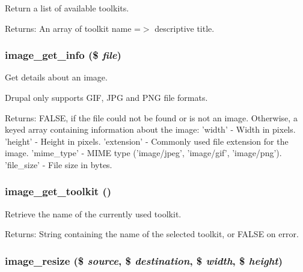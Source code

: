Return a list of available toolkits.

\begin{Desc}
\item[Returns:]An array of toolkit name =$>$ descriptive title. \end{Desc}
\hypertarget{group__image_g64daec548dec0ae4c1d30053446e8f80}{
\subsubsection[{image\_\-get\_\-info}]{\setlength{\rightskip}{0pt plus 5cm}image\_\-get\_\-info (\$ {\em file})}}
\label{group__image_g64daec548dec0ae4c1d30053446e8f80}


Get details about an image.

Drupal only supports GIF, JPG and PNG file formats.

\begin{Desc}
\item[Returns:]FALSE, if the file could not be found or is not an image. Otherwise, a keyed array containing information about the image: 'width' - Width in pixels. 'height' - Height in pixels. 'extension' - Commonly used file extension for the image. 'mime\_\-type' - MIME type ('image/jpeg', 'image/gif', 'image/png'). 'file\_\-size' - File size in bytes. \end{Desc}
\hypertarget{group__image_g08b3ce83f3526f248c1e08b4ee249a3a}{
\subsubsection[{image\_\-get\_\-toolkit}]{\setlength{\rightskip}{0pt plus 5cm}image\_\-get\_\-toolkit ()}}
\label{group__image_g08b3ce83f3526f248c1e08b4ee249a3a}


Retrieve the name of the currently used toolkit.

\begin{Desc}
\item[Returns:]String containing the name of the selected toolkit, or FALSE on error. \end{Desc}
\hypertarget{group__image_g160782a6325283b224cba85e2a4d3839}{
\subsubsection[{image\_\-resize}]{\setlength{\rightskip}{0pt plus 5cm}image\_\-resize (\$ {\em source}, \/  \$ {\em destination}, \/  \$ {\em width}, \/  \$ {\em height})}}
\label{group__image_g160782a6325283b224cba85e2a4d3839}


